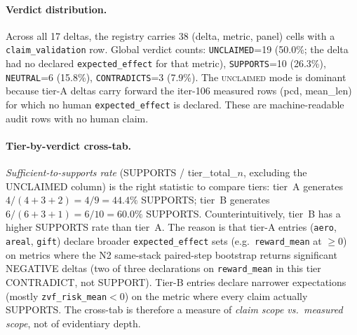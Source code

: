 \paragraph{Verdict distribution.}
Across all 17 deltas, the registry carries 38 (delta, metric, panel) cells
with a \texttt{claim\_validation} row.  Global verdict counts:
\texttt{UNCLAIMED}=19 (50.0\%; the delta had no declared
\texttt{expected\_effect} for that metric), \texttt{SUPPORTS}=10 (26.3\%),
\texttt{NEUTRAL}=6 (15.8\%), \texttt{CONTRADICTS}=3 (7.9\%).  The
\textsc{unclaimed} mode is dominant because tier-A deltas carry forward
the iter-106 measured rows (pcd, mean\_len) for which no human \texttt{expected\_effect}
is declared.  These are machine-readable audit rows with no human claim.

\paragraph{Tier-by-verdict cross-tab.}
\textit{Sufficient-to-supports rate} (SUPPORTS / tier\_total\_$n$, excluding
the UNCLAIMED column) is the right statistic to compare tiers: tier~A
generates $4/(4+3+2) = 4/9 = 44.4\%$ SUPPORTS; tier~B generates
$6/(6+3+1) = 6/10 = 60.0\%$ SUPPORTS.
Counterintuitively, tier~B has a higher SUPPORTS rate than tier~A.  The
reason is that tier-A entries (\texttt{aero}, \texttt{areal}, \texttt{gift})
declare broader \texttt{expected\_effect} sets (e.g.\
\texttt{reward\_mean} at $\geq 0$) on metrics where the N2 same-stack
paired-step bootstrap returns significant NEGATIVE deltas (two of three
declarations on \texttt{reward\_mean} in this tier CONTRADICT, not
SUPPORT).  Tier-B entries declare narrower expectations (mostly
\texttt{zvf\_risk\_mean}$<0$) on the metric where every claim actually
SUPPORTS.  The cross-tab is therefore a measure of \emph{claim scope vs.\
measured scope}, not of evidentiary depth.

